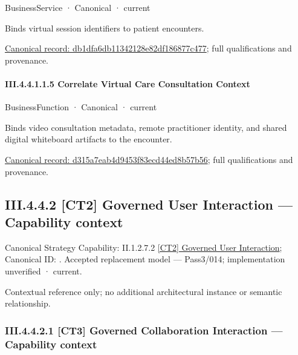 \label{element:db1dfa6db11342128e82df186877c477}
{\small BusinessService · Canonical · current}\par

Binds virtual session identifiers to patient encounters.


{\footnotesize \href{../../../../../../../../continuum/business/business-service/db1dfa6db11342128e82df186877c477.md}{Canonical record: db1dfa6db11342128e82df186877c477}; full qualifications and provenance.}\par
\paragraph*{III.4.4.1.1.5 Correlate Virtual Care Consultation Context}
\label{navigation:III.4.4.1.1.5}

\label{element:d315a7eab4d9453f83ecd44ed8b57b56}
{\small BusinessFunction · Canonical · current}\par

Binds video consultation metadata, remote practitioner identity, and shared digital whiteboard artifacts to the encounter.


{\footnotesize \href{../../../../../../../../continuum/business/business-function/d315a7eab4d9453f83ecd44ed8b57b56.md}{Canonical record: d315a7eab4d9453f83ecd44ed8b57b56}; full qualifications and provenance.}\par
\subsection*{III.4.4.2 [CT2] Governed User Interaction — Capability context}
\label{navigation:III.4.4.2}

{\small Canonical Strategy Capability: II.1.2.7.2 \hyperref[element:14c8b1a5515b4d3d9ac976594a4d00d8]{[CT2] Governed User Interaction}; Canonical ID: \texttt{}. Accepted replacement model — Pass3/014; implementation unverified · current.}\par
Contextual reference only; no additional architectural instance or semantic relationship.\par
\subsubsection*{III.4.4.2.1 [CT3] Governed Collaboration Interaction — Capability context}
\label{navigation:III.4.4.2.1}

